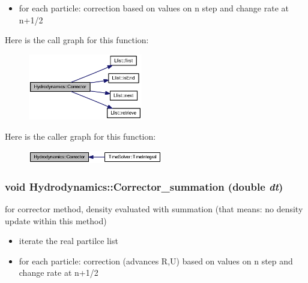 \begin{itemize}
\item for each particle: correction based on values on n step and change rate at n+1/2 \end{itemize}


Here is the call graph for this function:\nopagebreak
\begin{figure}[H]
\begin{center}
\leavevmode
\includegraphics[width=141pt]{classHydrodynamics_928a3fb7752d458026ed06dca1fbf137_cgraph}
\end{center}
\end{figure}


Here is the caller graph for this function:\nopagebreak
\begin{figure}[H]
\begin{center}
\leavevmode
\includegraphics[width=166pt]{classHydrodynamics_928a3fb7752d458026ed06dca1fbf137_icgraph}
\end{center}
\end{figure}
\hypertarget{classHydrodynamics_6a62dad5b8c33b504481a8e4e5b023cb}{
\subsubsection[{Corrector\_\-summation}]{\setlength{\rightskip}{0pt plus 5cm}void Hydrodynamics::Corrector\_\-summation (double {\em dt})}}
\label{classHydrodynamics_6a62dad5b8c33b504481a8e4e5b023cb}


for corrector method, density evaluated with summation (that means: no density update within this method) 



\begin{itemize}
\item iterate the real partilce list\end{itemize}


\begin{itemize}
\item for each particle: correction (advances R,U) based on values on n step and change rate at n+1/2 \end{itemize}


